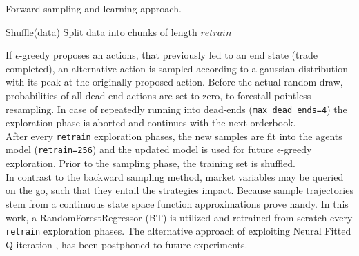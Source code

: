 \begin{algorithm}[H] 
 \caption{Forward sampling and learning approach.}
     \SetAlgoLined
     \footnotesize
     

Shuffle(data)\;
Split data into chunks of length $retrain$


\label{alg:forward:pseudocode}
\end{algorithm}\bigskip

If $\epsilon$-greedy proposes an actions, that previously led to an end state (\ie trade completed), an alternative action is sampled according to a gaussian distribution with its peak at the originally proposed action. Before the actual random draw, probabilities of all dead-end-actions are set to zero, to forestall pointless resampling. In case of repeatedly running into dead-ends (\eg \lstinline!max_dead_ends=4!) the exploration phase is aborted and continues with the next orderbook.\\

After every \lstinline!retrain! exploration phases, the new samples are fit into the agents model (\eg \lstinline!retrain=256!) and the updated model is used for future $\epsilon$-greedy exploration. Prior to the sampling phase, the training set is shuffled.\\

In contrast to the backward sampling method, market variables may be queried on the go, such that they entail the strategies impact. Because sample trajectories stem from a continuous state space function approximations prove handy. In this work, a RandomForestRegressor (\ie \ac{BT}) is utilized and retrained from scratch every \lstinline!retrain! exploration phases. The alternative approach of exploiting Neural Fitted Q-iteration \Cite{Riedmiller:2005:NFQ}, has been postphoned to future experiments.\\











\cleardoublepage{}